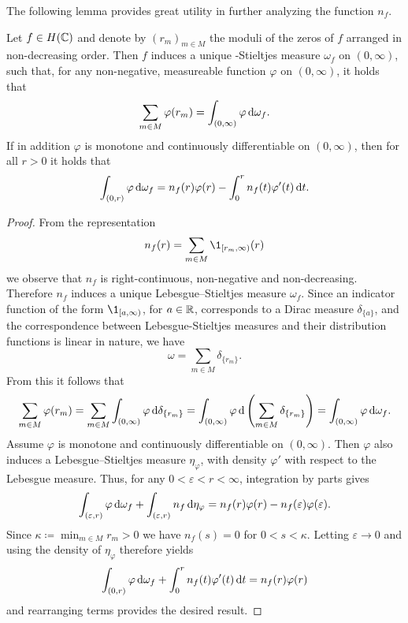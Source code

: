 The following lemma provides great utility in further analyzing the function $n_f$.

\begin{lemma} \label{lem:zeros-measure}
    Let $f \in H(\mathbb{C})$ and denote by $(r_m)_{m \in M}$ the moduli of the zeros of $f$ arranged in non-decreasing order. Then $f$ induces a unique -Stieltjes measure $\omega_f$ on $(0, \infty)$, such that, for any non-negative, measureable function $\varphi$ on $(0, \infty)$, it holds that
    \begin{equation*}
        \sum_{m \in M} \varphi(r_m) = \int_{(0, \infty)} \varphi \mathop{}\!\mathrm{d} \omega_f.
    \end{equation*}
    If in addition $\varphi$ is monotone and continuously differentiable on $(0, \infty)$, then for all $r > 0$ it holds that
    \begin{equation*}
        \int_{(0, r)} \varphi \mathop{}\!\mathrm{d} \omega_f = n_f(r) \varphi(r) - \int_0^r n_f(t) \varphi'(t) \mathop{}\!\mathrm{d} t.
    \end{equation*}
\end{lemma}

\begin{proof}
    From the representation
    $$ n_f(r) = \sum_{m \in M} \1_{[r_m, \infty)}(r) $$
    we observe that $n_f$ is right-continuous, non-negative and non-decreasing. Therefore $n_f$ induces a unique Lebesgue--Stieltjes measure $\omega_f$. Since an indicator function of the form $\1_{[a, \infty)}$, for $a \in \mathbb{R}$, corresponds to a Dirac measure $\delta_{\{ a \}}$, and the correspondence between Lebesgue-Stieltjes measures and their distribution functions is linear in nature, we have
    $$ \omega = \sum_{m \in M} \delta_{\{r_m\}}. $$
    From this it follows that
    \begin{equation*}
        \sum_{m \in M} \varphi(r_m) = \sum_{m \in M} \int_{(0, \infty)} \varphi \mathop{}\!\mathrm{d} \delta_{\{r_m\}} = \int_{(0, \infty)} \varphi \mathop{}\!\mathrm{d} \left( \sum_{m \in M} \delta_{\{r_m\}} \right) = \int_{(0, \infty)} \varphi \mathop{}\!\mathrm{d} \omega_f.
    \end{equation*}
    Assume $\varphi$ is monotone and continuously differentiable on $(0, \infty)$. Then $\varphi$ also induces a Lebesgue--Stieltjes measure $\eta_\varphi$, with density $\varphi'$ with respect to the Lebesgue measure. Thus, for any $0 < \varepsilon < r < \infty$, integration by parts gives
    \begin{equation*}
        \int_{(\varepsilon, r)} \varphi \mathop{}\!\mathrm{d} \omega_f + \int_{(\varepsilon, r)} n_f \mathop{}\!\mathrm{d} \eta_\varphi = n_f(r) \varphi(r) - n_f(\varepsilon) \varphi(\varepsilon).
    \end{equation*}
    Since $\kappa \coloneqq \min_{m \in M} r_m > 0$ we have $n_f(s) = 0$ for $0 < s < \kappa$. Letting $\varepsilon \to 0$ and using the density of $\eta_\varphi$ therefore yields
    \begin{equation*}
        \int_{(0, r)} \varphi \mathop{}\!\mathrm{d} \omega_f + \int_0^r n_f(t) \varphi'(t) \mathop{}\!\mathrm{d} t = n_f(r) \varphi(r)
    \end{equation*}
    and rearranging terms provides the desired result.
\end{proof}

